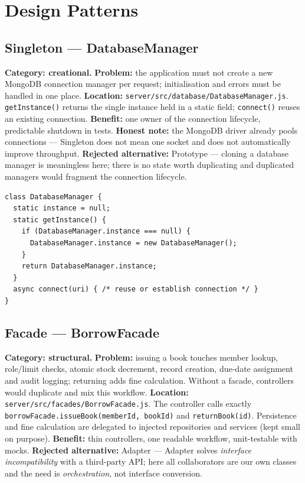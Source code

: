 \documentclass[12pt,a4paper]{article}
\begin{document}
\section{Design Patterns}

\subsection{Singleton — DatabaseManager}
\textbf{Category: creational.} \textbf{Problem:} the application must not
create a new MongoDB connection manager per request; initialisation and
errors must be handled in one place. \textbf{Location:}
\texttt{server/src/database/DatabaseManager.js}. \texttt{getInstance()}
returns the single instance held in a static field; \texttt{connect()}
reuses an existing connection. \textbf{Benefit:} one owner of the connection
lifecycle, predictable shutdown in tests. \textbf{Honest note:} the MongoDB
driver already pools connections — Singleton does not mean one socket and
does not automatically improve throughput. \textbf{Rejected alternative:}
Prototype — cloning a database manager is meaningless here; there is no
state worth duplicating and duplicated managers would fragment the
connection lifecycle.

\begin{lstlisting}[caption={Singleton core (excerpt)},label=lst:singleton]
class DatabaseManager {
  static instance = null;
  static getInstance() {
    if (DatabaseManager.instance === null) {
      DatabaseManager.instance = new DatabaseManager();
    }
    return DatabaseManager.instance;
  }
  async connect(uri) { /* reuse or establish connection */ }
}
\end{lstlisting}

\subsection{Facade — BorrowFacade}
\textbf{Category: structural.} \textbf{Problem:} issuing a book touches
member lookup, role/limit checks, atomic stock decrement, record creation,
due-date assignment and audit logging; returning adds fine calculation.
Without a facade, controllers would duplicate and mix this workflow.
\textbf{Location:} \texttt{server/src/facades/BorrowFacade.js}. The
controller calls exactly \texttt{borrowFacade.issueBook(memberId, bookId)}
and \texttt{returnBook(id)}. Persistence and fine calculation are delegated
to injected repositories and services (kept small on purpose).
\textbf{Benefit:} thin controllers, one readable workflow, unit-testable
with mocks. \textbf{Rejected alternative:} Adapter — Adapter solves
\emph{interface incompatibility} with a third-party API; here all
collaborators are our own classes and the need is \emph{orchestration}, not
interface conversion.
\end{document}
